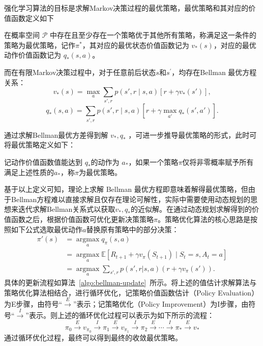 强化学习算法的目标是求解Markov决策过程的最优策略，最优策略和其对应的价值函数定义如下
\begin{definition}
    在概率空间 $\mathcal{P}$ 中存在且至少存在一个策略优于其他所有策略，称满足这一条件的策略为最优策略，记作$\pi^*$，其对应的最优状态价值函数记为 $v_*(s)$，对应的最优动作价值函数记为 $q_*(s,a)$。
\end{definition}

而在有限Markov决策过程中，对于任意前后状态$s$和$s^\prime$，均存在Bellman 最优方程关系\cite{white1963dynamic}：
\begin{equation}\label{eq:v_star}
    v_*(s)=\max_{a}\sum_{s',r}p(s',r \mid s,a)[r+\gamma v_*(s')],
\end{equation}
\begin{equation}\label{eq:q_star}
q_*(s,a) = \sum_{s',r}p(s',r \mid s,a)\left[r+\gamma \max_{a'}q_*(s',a') \right].
\end{equation}

通过求解Bellman最优方差得到解 $v_*,q_*$ ，可进一步推导最优策略的形式，此时可将最优策略定义如下：
\begin{definition}
    记动作价值函数值能达到 $q_*$的动作为 $a_*$，如果一个策略$\pi$仅将非零概率赋予所有满足上述性质的$a_*$，称$\pi$为最优策略。
\end{definition}

基于以上定义可知，理论上求解 Bellman 最优方程即意味着解得最优策略，但由于Bellman方程难以直接求解且仅存在理论可解性，实际中需要使用动态规划的思想来迭代求解Bellman关系式以获取$v_*,q_*$的近似解\cite{sutton2018reinforcement}。在通过动态规划求解得到的价值函数之后，根据价值函数可优化更新决策策略$\pi$。策略优化算法的核心思路是按照如下公式选取最优动作$a$替换原有策略中的部分决策：
\begin{equation}
    \begin{aligned}
    \pi'(s) &= \mathop{\arg\max}\limits_a q_\pi(s, a)\\&=\mathop{\arg\max}\limits_a \mathbb{E}[R_{t+1}+\gamma v_\pi(S_{t+1})\mid S_t=s,A_t=a] \\&= \mathop{\arg\max}\limits_a \sum_{s',r} p(s', r | s, a) (r + \gamma v_\pi(s')).
    \end{aligned}
\end{equation}
具体的更新流程如算法~\ref{algo:bellman-update}~所示。将上述的值估计求解算法与策略优化算法相结合，进行循环优化，记策略价值函数估计（Policy Evaluation）为E步骤，由符号“$\xrightarrow{E}$”表示；记策略优化（Policy Improvement）为I步骤，由符号“$\xrightarrow{I}$”表示。则上述的循环优化过程可以表示为如下所示的流程：
\begin{equation}
\pi_0 \xrightarrow{E} v_{\pi_0} \xrightarrow{I}\pi_1 \xrightarrow{E} v_{\pi_1} \xrightarrow{I} \pi_2 \xrightarrow{E} \cdots \xrightarrow{I} \pi_* \xrightarrow{E} v_*
\end{equation}
通过循环优化过程，最终可以得到最终的收敛最优策略。

